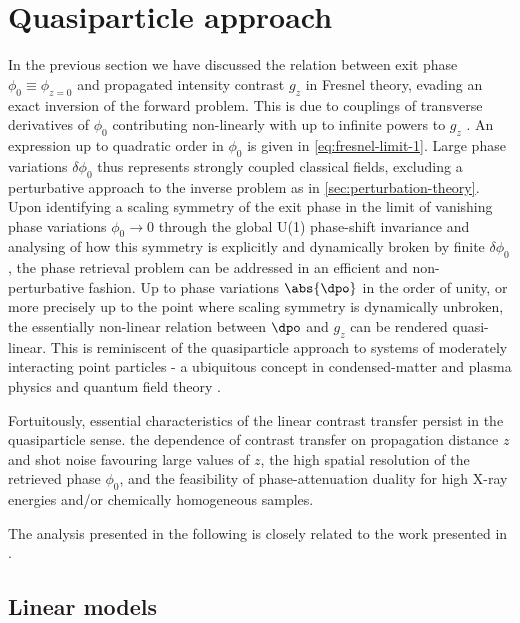 \documentclass[
twoside,
openright,
titlepage,
numbers=noenddot,
headinclude,
fleqn,
a4paper,
footinclude=true,
cleardoublepage=empty,
abstractoff,
BCOR=5mm,
paper=a4,
fontsize=11pt,
british,ngerman,american,
]{scrreprt}
\begin{document}
\section{Quasiparticle approach}
\label{sec:qp}


In the previous section we have discussed the relation between exit
phase $\phi_0\equiv\phi_{z=0}$ and propagated intensity contrast
$g_{z}$ in Fresnel theory, evading an exact inversion of the forward
problem.  This is due to couplings of transverse derivatives of
$\phi_0$ contributing non-linearly with up to infinite powers to
$g_{z}$ \cite{Moosmann2010opex}.  An expression up to quadratic order
in $\phi_0$ is given in \cref{eq:fresnel-limit-1}.  Large phase
variations $\delta\phi_0$ thus represents strongly coupled classical
fields, excluding a perturbative approach to the inverse problem as in
\cref{sec:perturbation-theory}.  Upon identifying a scaling symmetry
of the exit phase in the limit of vanishing phase variations
$\phi_0\to 0$ through the global U(1) phase-shift invariance and
analysing of how this symmetry is explicitly and dynamically broken by
finite $\delta\phi_0$, the phase retrieval problem can be addressed in
an efficient and non-perturbative fashion.  Up to phase variations
$\abs{\dpo}$ in the order of unity, or more precisely up to the point
where scaling symmetry is dynamically unbroken, the essentially
non-linear relation between $\dpo$ and $g_z$ can be rendered
quasi-linear.  This is reminiscent of the quasiparticle approach to
systems of moderately interacting point particles - a ubiquitous
concept in condensed-matter and plasma physics and quantum field
theory \cite{Landau1957,Abrikosov1959,HofmannBook}.

Fortuitously, essential characteristics of the linear contrast
transfer persist in the quasiparticle sense. \Ie{} the dependence of
contrast transfer on propagation distance $z$ and shot noise favouring
large values of $z$, the high spatial resolution of the
retrieved phase $\phi_0$, and the feasibility of phase-attenuation
duality for high X-ray energies and/or chemically homogeneous samples.

The analysis presented in the following is closely related to the work
presented in \cite{Moosmann2011opex,Hofmann2011opex,Hofmann2014}.


\subsection{Linear models}
\label{sec:qp-linear-models}
\end{document}
